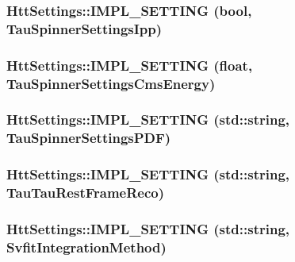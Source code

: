 \label{classHttSettings_a962c50a239f57a36583e58c16df03009}
\hypertarget{classHttSettings_a3d0bb915529eab47fc3d93b281dc00f1}{
\subsubsection[{IMPL\_\-SETTING}]{\setlength{\rightskip}{0pt plus 5cm}HttSettings::IMPL\_\-SETTING (bool, \/  TauSpinnerSettingsIpp)}}
\label{classHttSettings_a3d0bb915529eab47fc3d93b281dc00f1}
\hypertarget{classHttSettings_a71ed554cb43c01667c0b873b920c4b7c}{
\subsubsection[{IMPL\_\-SETTING}]{\setlength{\rightskip}{0pt plus 5cm}HttSettings::IMPL\_\-SETTING (float, \/  TauSpinnerSettingsCmsEnergy)}}
\label{classHttSettings_a71ed554cb43c01667c0b873b920c4b7c}
\hypertarget{classHttSettings_ab224cd5b480c995543678864a4e0ce0c}{
\subsubsection[{IMPL\_\-SETTING}]{\setlength{\rightskip}{0pt plus 5cm}HttSettings::IMPL\_\-SETTING (std::string, \/  TauSpinnerSettingsPDF)}}
\label{classHttSettings_ab224cd5b480c995543678864a4e0ce0c}
\hypertarget{classHttSettings_abcde40e309d5a43f7e4b6842c9efe4e9}{
\subsubsection[{IMPL\_\-SETTING}]{\setlength{\rightskip}{0pt plus 5cm}HttSettings::IMPL\_\-SETTING (std::string, \/  TauTauRestFrameReco)}}
\label{classHttSettings_abcde40e309d5a43f7e4b6842c9efe4e9}
\hypertarget{classHttSettings_a01f8ffe8b57c0e0a5ce42ddea4074b10}{
\subsubsection[{IMPL\_\-SETTING}]{\setlength{\rightskip}{0pt plus 5cm}HttSettings::IMPL\_\-SETTING (std::string, \/  SvfitIntegrationMethod)}}
